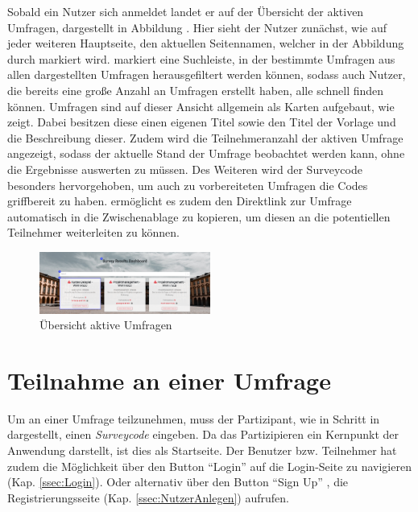 Sobald ein Nutzer sich anmeldet landet er auf der Übersicht der aktiven Umfragen, dargestellt in Abbildung .
Hier sieht der Nutzer zunächst, wie auf jeder weiteren Hauptseite, den aktuellen Seitennamen, welcher in der Abbildung durch \desOne markiert wird.
\desTwo markiert eine Suchleiste, in der bestimmte Umfragen aus allen dargestellten Umfragen herausgefiltert werden können, sodass auch Nutzer, die bereits eine große Anzahl an Umfragen erstellt haben, alle schnell finden können.
Umfragen sind auf dieser Ansicht allgemein als Karten aufgebaut, wie \desThree zeigt.
Dabei besitzen diese einen eigenen Titel sowie den Titel der Vorlage und die Beschreibung dieser.
Zudem wird die Teilnehmeranzahl der aktiven Umfrage angezeigt, sodass der aktuelle Stand der Umfrage beobachtet werden kann, ohne die Ergebnisse auswerten zu müssen.
Des Weiteren wird der Surveycode besonders hervorgehoben, um auch zu vorbereiteten Umfragen die Codes griffbereit zu haben.
\faClipboard\xspace ermöglicht es zudem den Direktlink zur Umfrage automatisch in die Zwischenablage zu kopieren, um diesen an die potentiellen Teilnehmer weiterleiten zu können.

\begin{figure}[H]
	\centering
	\includegraphics[width=0.5\textwidth, keepaspectratio]{img/guide/ResultDashboard.png}
	\captionsetup{justification=centering, format=plain}
	\caption[Übersicht aktive Umfragen]{Übersicht aktive Umfragen \\\quelleScreenshot}
	\label{fig:ResultDashboard}
\end{figure}


\section{Teilnahme an einer Umfrage}
\label{ssec:TeilnahmeAnEinerUmfrage}

Um an einer Umfrage teilzunehmen, muss der Partizipant, wie in Schritt \desOne in \abb {} dargestellt, einen \emph{Surveycode} eingeben.
Da das Partizipieren ein Kernpunkt der Anwendung darstellt, ist dies als Startseite.
Der Benutzer bzw. Teilnehmer hat zudem die Möglichkeit über den Button \enquote{Login} \desTwo auf die Login-Seite zu navigieren (Kap. \vref{ssec:Login}). 
Oder alternativ über den Button \enquote{Sign Up} \desThree, die Registrierungsseite (Kap. \vref{ssec:NutzerAnlegen}) aufrufen.

